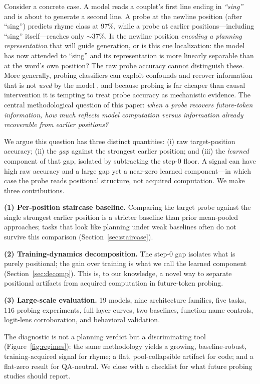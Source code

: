 \documentclass[11pt]{article}
\begin{document}
Consider a concrete case. A model reads a couplet's first line ending in
\emph{``sing''} and is about to generate a second line. A probe at the newline
position (after ``sing'') predicts rhyme class at 97\%, while a probe at
earlier positions---including ``sing'' itself---reaches only $\sim$37\%. Is
the newline position \emph{encoding a planning representation} that will guide
generation, or is this cue localization: the model has now attended to
``sing'' and its representation is more linearly separable than at the word's
own position? The raw probe accuracy cannot distinguish these. More generally,
probing classifiers can exploit confounds and recover information that is not
\emph{used} by the model \citep{hewitt2019,belinkov2022,voita2020}, and
because probing is far cheaper than causal intervention it is tempting to treat
probe accuracy as mechanistic evidence. The central methodological question of
this paper: \emph{when a probe recovers future-token information, how much
reflects model computation versus information already recoverable from earlier
positions?}

We argue this question has three distinct quantities: (i) raw target-position
accuracy; (ii) the \emph{gap} against the strongest earlier position; and (iii)
the \emph{learned} component of that gap, isolated by subtracting the step-0
floor. A signal can have high raw accuracy and a large gap yet a near-zero
learned component---in which case the probe reads positional structure, not
acquired computation. We make three contributions.

\textbf{(1) Per-position staircase baseline.} Comparing the target probe against
the single strongest earlier position is a stricter baseline than prior
mean-pooled approaches; tasks that look like planning under weak baselines often
do not survive this comparison (Section~\ref{sec:staircase}).

\textbf{(2) Training-dynamics decomposition.} The step-0 gap isolates what is
purely positional; the gain over training is what we call the learned component
(Section~\ref{sec:decomp}). This is, to our knowledge, a novel way to
separate positional artifacts from acquired computation in future-token probing.

\textbf{(3) Large-scale evaluation.} 19 models, nine architecture families,
five tasks, 116 probing experiments, full layer curves, two baselines,
function-name controls, logit-lens corroboration, and behavioral validation.

The diagnostic is not a planning verdict but a discriminating tool
(Figure~\ref{fig:regimes}): the same methodology yields a growing,
baseline-robust, training-acquired signal for rhyme; a flat, pool-collapsible
artifact for code; and a flat-zero result for QA-neutral. We close with a
checklist for what future probing studies should report.
\end{document}
